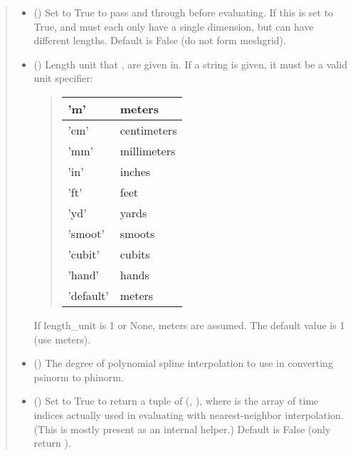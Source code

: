 \documentclass[letterpaper,10pt,english]{sphinxmanual}
\begin{document}
\begin{fulllineitems}
\begin{fulllineitems}
\begin{quote}
\begin{description}
\begin{itemize}
\item {} 
 () \textendash{} Set to True to pass  and  through
 before evaluating. If this is set to
True,  and  must each only have a single dimension, but
can have different lengths. Default is False (do not form
meshgrid).

\item {} 
 () \textendash{} 
Length unit that ,  are given in.
If a string is given, it must be a valid unit specifier:
\begin{quote}


\begin{savenotes}\sphinxattablestart
\centering
\begin{tabulary}{\linewidth}[t]{|T|T|}
\hline

’m’
&
meters
\\
\hline
’cm’
&
centimeters
\\
\hline
’mm’
&
millimeters
\\
\hline
’in’
&
inches
\\
\hline
’ft’
&
feet
\\
\hline
’yd’
&
yards
\\
\hline
’smoot’
&
smoots
\\
\hline
’cubit’
&
cubits
\\
\hline
’hand’
&
hands
\\
\hline
’default’
&
meters
\\
\hline
\end{tabulary}
\par
\sphinxattableend\end{savenotes}
\end{quote}

If length\_unit is 1 or None, meters are assumed. The default
value is 1 (use meters).


\item {} 
 () \textendash{} The degree of polynomial spline interpolation to
use in converting psinorm to phinorm.

\item {} 
 () \textendash{} Set to True to return a tuple of (,
), where  is the array of time indices
actually used in evaluating  with nearest-neighbor
interpolation. (This is mostly present as an internal helper.)
Default is False (only return ).


\end{itemize}
\end{description}
\end{quote}
\end{fulllineitems}
\end{fulllineitems}
\end{document}
